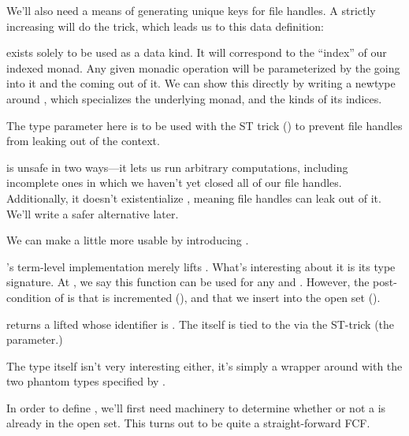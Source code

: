 \documentclass[book.tex]{subfiles}
\begin{document}
We'll also need a means of generating unique keys for file handles. A strictly
increasing  will do the trick, which leads us to this data definition:


 exists solely to be used as a data kind. It will correspond to
the ``index'' of our indexed monad. Any given monadic operation will be
parameterized by the  going into it and the 
coming out of it. We can show this directly by writing a newtype around ,
which specializes the underlying monad, and the kinds of its indices.


The  type parameter here is to be used with the \gls{ST trick}
() to prevent file handles from leaking out of the
 context.

 is unsafe in two ways---it lets us run arbitrary
 computations, including incomplete ones in which we haven't yet
closed all of our file handles. Additionally, it doesn't existentialize ,
meaning file handles can leak out of it. We'll write a safer alternative later.

We can make  a little more usable by introducing .


's term-level implementation merely lifts .
What's interesting about it is its type signature. At , we say this
function can be used for any  and . However, the
post-condition of  is that  is incremented (), and
that we insert  into the open set ().

 returns a lifted  whose identifier is . The
 itself is tied to the  via the ST-trick (the 
parameter.)

The  type itself isn't very interesting either, it's simply a wrapper
around  with the two \gls{phantom} types specified by
.


In order to define , we'll first need machinery to determine
whether or not a  is already in the open set. This turns out to be
quite a straight-forward FCF.

\end{document}
